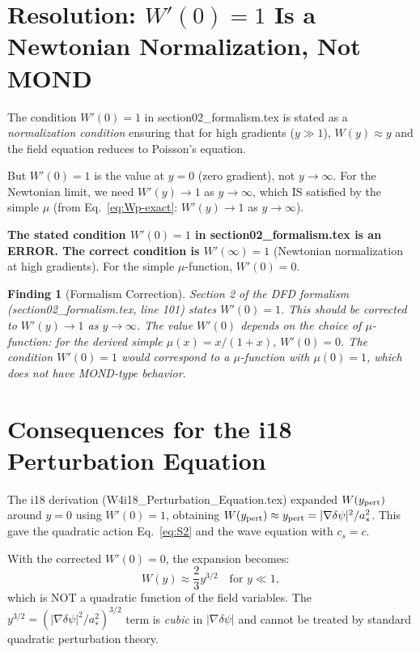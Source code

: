 \documentclass[11pt]{article}
\newtheorem{finding}{Finding}
\newcommand{\dpsi}{\delta\psi}
\newcommand{\astar}{a_*}
\begin{document}
\section{Resolution: $W'(0) = 1$ Is a Newtonian Normalization, Not MOND}

The condition $W'(0) = 1$ in section02\_formalism.tex is stated as a
\emph{normalization condition} ensuring that for high gradients
($y \gg 1$), $W(y) \approx y$ and the field equation reduces to
Poisson's equation.

But $W'(0) = 1$ is the value at $y = 0$ (zero gradient), not
$y \to \infty$. For the Newtonian limit, we need $W'(y) \to 1$ as
$y \to \infty$, which IS satisfied by the simple $\mu$ (from
Eq.~\eqref{eq:Wp-exact}: $W'(y) \to 1$ as $y \to \infty$).

\textbf{The stated condition $W'(0) = 1$ in section02\_formalism.tex
is an ERROR. The correct condition is $W'(\infty) = 1$} (Newtonian
normalization at high gradients). For the simple $\mu$-function,
$W'(0) = 0$.

\begin{finding}[Formalism Correction]
\label{find:correction}
Section 2 of the DFD formalism (section02\_formalism.tex, line 101)
states $W'(0) = 1$. This should be corrected to $W'(y) \to 1$ as
$y \to \infty$. The value $W'(0)$ depends on the choice of
$\mu$-function: for the derived simple $\mu(x) = x/(1+x)$,
$W'(0) = 0$. The condition $W'(0) = 1$ would correspond to a
$\mu$-function with $\mu(0) = 1$, which does not have MOND-type
behavior.
\end{finding}

\section{Consequences for the i18 Perturbation Equation}

The i18 derivation (W4i18\_Perturbation\_Equation.tex) expanded
$W(y_{\rm pert})$ around $y = 0$ using $W'(0) = 1$, obtaining
$W(y_{\rm pert}) \approx y_{\rm pert} = |\nabla\dpsi|^2/\astar^2$.
This gave the quadratic action Eq.~\eqref{eq:S2} and the wave
equation with $c_s = c$.

With the corrected $W'(0) = 0$, the expansion becomes:
\begin{equation}
W(y) \approx \frac{2}{3}y^{3/2} \quad\text{for } y \ll 1,
\end{equation}
which is NOT a quadratic function of the field variables. The
$y^{3/2} = (|\nabla\dpsi|^2/\astar^2)^{3/2}$ term is \emph{cubic}
in $|\nabla\dpsi|$ and cannot be treated by standard quadratic
perturbation theory.
\end{document}
